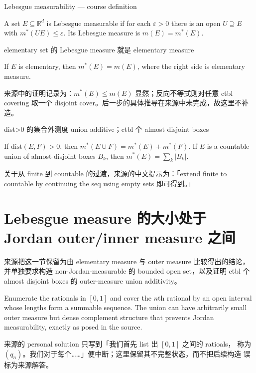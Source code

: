\begin{definition}{Lebesgue measurability --- course definition}

A set \(E \subseteq \mathbb{R}^{d}\) is Lebesgue measurable if for each \(\varepsilon > 0\) there is an open \(U \supseteq E\) with \(m^{\ast}\left( {UE} \right) \leq \varepsilon\). Its Lebesgue measure is \(m(E) = m^{\ast}(E)\).

\end{definition}

\begin{theorem}{elementary set 的 Lebesgue measure 就是 elementary measure}

If \(E\) is elementary, then \(m^{\ast}(E) = m(E)\), where the right side is elementary measure.

\end{theorem}

来源中的证明记录为：\(m^{\ast}(E) \leq m(E)\) 显然；反向不等式则对任意 ctbl covering 取一个 disjoint cover。后一步的具体推导在来源中未完成，故这里不补造。

\begin{theorem}{dist\textgreater0 的集合外测度 union additive；ctbl 个 almost disjoint
boxes}

If \(\text{dist}\left( {E,F} \right) > 0\), then \(m^{\ast}\left( {E \cup F} \right) = m^{\ast}(E) + m^{\ast}(F)\). If \(E\) is a countable union of almost-disjoint boxes \(B_{k}\), then \(m^{\ast}(E) = \sum_{k}\left| B_{k} \right|\).

\end{theorem}

关于从 finite 到 countable 的过渡，来源的中文提示为：「extend finite to countable by continuing the seq using empty sets 即可得到。」

\section{Lebesgue measure 的大小处于 Jordan outer/inner measure 之间}

来源把这一节保留为由 elementary measure 与 outer measure 比较得出的结论， 并单独要求构造 non-Jordan-measurable 的 bounded open set，以及证明 ctbl 个 almost disjoint boxes 的 outer-measure union additivity。

\begin{example}

Enumerate the rationals in \(\left\lbrack {0,1} \right\rbrack\) and cover the \(n\)th rational by an open interval whose lengths form a summable sequence. The union can have arbitrarily small outer measure but dense complement structure that prevents Jordan measurability, exactly as posed in the source.

\end{example}

来源的 personal solution 只写到「我们首先 list 出 \(\left\lbrack {0,1} \right\rbrack\) 之间的 ratioals， 称为 \(\left( q_{n} \right)\)。我们对于每个\ldots\ldots」便中断；这里保留其不完整状态，而不把后续构造 误标为来源解答。
